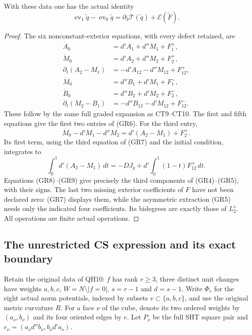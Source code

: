 \begin{lemma}
With these data one has the actual identity
\[
 \operatorname{ev}_1\widetilde q-\operatorname{ev}_0\widetilde q
            =\partial_3\mathcal T(\widetilde q)
                              +\mathcal E(\widetilde F).
 \tag{GR6}
\]
\end{lemma}

\begin{proof}
The six nonconstant-exterior equations, with every defect retained,
are
\[
 \begin{split}
 \dot A_0&=d'A_1+d''M_1+F_1^+,\\
 \dot M_0&=d'A_2+d''M_2+F_2^+,\\
 \partial_t(A_2-M_1)&=-d'A_{12}-d''M_{12}+F_{12}^+,\\
 \dot M_0&=d''B_1+d'M_1+F_1^-,\\
 \dot B_0&=d''B_2+d'M_2+F_2^-,\\
 \partial_t(M_2-B_1)&=-d''B_{12}-d'M_{12}+F_{12}^-.
 \end{split}
 \tag{GR7}
\]
These follow by the same full graded expansion as CT9--CT10.
The first and fifth equations give the first two entries of
(GR6).  For the third entry,
\[
 \dot M_0-d'M_1-d''M_2=d'(A_2-M_1)+F_2^+.
 \tag{GR8}
\]
Its first term, using the third equation of (GR7) and the initial
condition, integrates to
\[
 \int_0^1d'(A_2-M_1)\,dt
   =-DJ_q+d'\int_0^1(1-t)F_{12}^+\,dt.
 \tag{GR9}
\]
Equations (GR8)--(GR9) give precisely the third components of
(GR4)--(GR5), with their signs.  The last two missing exterior
coefficients of $F$ have not been declared zero: (GR7) displays
them, while the asymmetric extraction (GR5) needs only the
indicated four coefficients.  Its bidegrees are exactly those
of $L_2^s$.  All operations are finite actual operations.
\end{proof}

\subsection{The unrestricted CS expression and its exact boundary}

Retain the original data of QH10: $f$ has rank $r\ge3$, three
distinct unit changes have weights $a,b,c$, $W=N\setminus|f=0|$,
$s=r-1$ and $d=s-1$.  Write $\Phi_v$ for the eight actual norm
potentials, indexed by subsets $v\subset\{a,b,c\}$, and use
the original metric curvature $R$.  For a face $\nu$ of the
cube, denote its two ordered weights by $(a_\nu,b_\nu)$ and
its four oriented edges by $e$.  Let $P_\nu$ be the full SHT
square pair and $e_\nu=(a_\nu d''b_\nu,b_\nu d'a_\nu)$.

